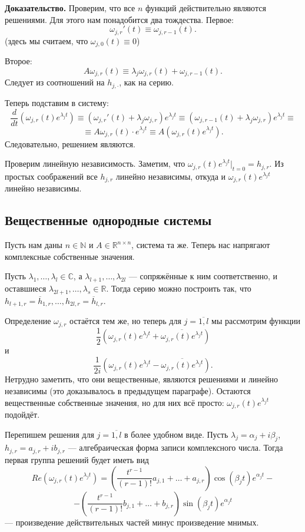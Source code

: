 \textbf{Доказательство.} Проверим, что все $n$ функций действительно являются решениями.
Для этого нам понадобится два тождества.
Первое:
\[
    \omega_{j,r}'(t) \equiv \omega_{j,r-1}(t).
\]
(здесь мы считаем, что $\omega_{j,0}(t) \equiv 0$)

Второе:
\[
    A \omega_{j,r}(t) \equiv \lambda_j \omega_{j,r}(t) + \omega_{j,r-1}(t).
\]
Следует из соотношений на $h_{j,\cdot}$, как на серию.

Теперь подставим в систему:
\[
    \frac{d}{dt} \left( \omega_{j,r}(t) e^{\lambda_j t} \right) \equiv \left( \omega_{j,r}'(t) + \lambda_j \omega_{j,r} \right) e^{\lambda_j t} \equiv (\omega_{j,r-1}(t) + \lambda_j \omega_{j,r}) e^{\lambda_j t} \equiv
\]
\[
    \equiv A\omega_{j,r}(t) \cdot e^{\lambda_j t} \equiv A (\omega_{j,r}(t) e^{\lambda_j t}).
\]
Следовательно, решением являются.

Проверим линейную независимость.
Заметим, что $\omega_{j,r}(t) e^{\lambda_j t} |_{t=0} = h_{j,r}$.
Из простых соображений все $h_{j,r}$ линейно независимы, откуда и $\omega_{j,r}(t) e^{\lambda_j t}$ линейно независимы.

\QED

\subsection{Вещественные однородные системы}
Пусть нам даны $n \in \mathbb N$ и $A \in \mathbb R^{n \times n}$, система та же.
Теперь нас напрягают комплексные собственные значения.

Пусть $\lambda_1, \dots, \lambda_l \in \mathbb C$, а $\lambda_{l+1}, \dots, \lambda_{2l}$ --- сопряжённые к ним соответственно, и оставшиеся $\lambda_{2l+1}, \dots, \lambda_s \in \mathbb R$.
Тогда серию можно построить так, что $h_{l+1, r} = \overline h_{1,r}, \dots, h_{2l,r} = \overline h_{l,r}$.

Определение $\omega_{j,r}$ остаётся тем же, но теперь для $j = \overline{1,l}$ мы рассмотрим функции
\[
    \frac{1}{2} \left( \omega_{j,r}(t) e^{\lambda_j t} + \overline{\omega_{j,r}(t) e^{\lambda_j t}} \right)
\]
и
\[
    \frac{1}{2i} \left( \omega_{j,r}(t) e^{\lambda_j t} - \overline{\omega_{j,r}(t) e^{\lambda_j t}} \right).
\]
Нетрудно заметить, что они вещественные, являются решениями и линейно независимы (это доказывалось в предыдущем параграфе).
Остаются вещественные собственные значения, но для них всё просто: $\omega_{j,r}(t) e^{\lambda_j t}$ подойдёт.

Перепишем решения для $j = \overline{1,l}$ в более удобном виде.
Пусть $\lambda_j = \alpha_j + i\beta_j$, $h_{j,r} = a_{j,r} + ib_{j,r}$ --- алгебраическая форма записи комплексного числа.
Тогда первая группа решений будет иметь вид
\[
    Re \left( \omega_{j,r}(t) e^{\lambda_j t} \right) = \left( \frac{t^{r-1}}{(r-1)!} a_{j,1} + \dots + a_{j,r} \right) \cos(\beta_j t) e^{\alpha_j t} -
\]
\[
    - \left( \frac{t^{r-1}}{(r-1)!} b_{j,1} + \dots + b_{j,r} \right) \sin(\beta_j t) e^{\alpha_j t}
\]
--- произведение действительных частей минус произведение мнимых.

